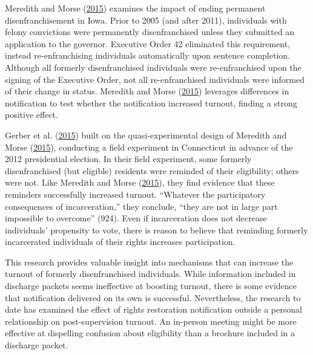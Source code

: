 \documentclass[
  12pt,
]{article}
\begin{document}
Meredith and Morse (\protect\hyperlink{ref-Meredith2015}{2015}) examines the impact of ending permanent disenfranchisement in Iowa. Prior to 2005 (and after 2011), individuals with felony convictions were permanently disenfranchised unless they submitted an application to the governor. Executive Order 42 eliminated this requirement, instead re-enfranchising individuals automatically upon sentence completion. Although all formerly disenfranchised individuals were re-enfranchised upon the signing of the Executive Order, not all re-enfranchised individuals were informed of their change in status. Meredith and Morse (\protect\hyperlink{ref-Meredith2015}{2015}) leverages differences in notification to test whether the notification increased turnout, finding a strong positive effect.

Gerber et al. (\protect\hyperlink{ref-Gerber2015}{2015}) built on the quasi-experimental design of Meredith and Morse (\protect\hyperlink{ref-Meredith2015}{2015}), conducting a field experiment in Connecticut in advance of the 2012 presidential election. In their field experiment, some formerly disenfranchised (but eligible) residents were reminded of their eligibility; others were not. Like Meredith and Morse (\protect\hyperlink{ref-Meredith2015}{2015}), they find evidence that these reminders successfully increased turnout. ``Whatever the participatory consequences of incarceration,'' they conclude, ``they are not in large part impossible to overcome'' (924). Even if incarceration does not decrease individuals' propensity to vote, there is reason to believe that reminding formerly incarcerated individuals of their rights increases participation.

This research provides valuable insight into mechanisms that can increase the turnout of formerly disenfranchised individuals. While information included in discharge packets seems ineffective at boosting turnout, there is some evidence that notification delivered on its own is successful. Nevertheless, the research to date has examined the effect of rights restoration notification outside a personal relationship on post-supervision turnout. An in-person meeting might be more effective at dispelling confusion about eligibility than a brochure included in a discharge packet.
\end{document}
